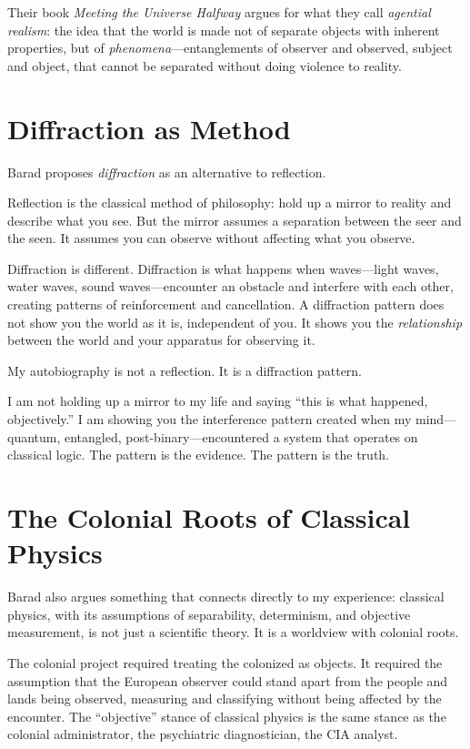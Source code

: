 \documentclass[11pt,openany]{book}
\begin{document}
Their book \textit{Meeting the Universe Halfway} argues for what they call \textit{agential realism}: the idea that the world is made not of separate objects with inherent properties, but of \textit{phenomena}---entanglements of observer and observed, subject and object, that cannot be separated without doing violence to reality.

\section*{Diffraction as Method}

Barad proposes \textit{diffraction} as an alternative to reflection.

Reflection is the classical method of philosophy: hold up a mirror to reality and describe what you see. But the mirror assumes a separation between the seer and the seen. It assumes you can observe without affecting what you observe.

Diffraction is different. Diffraction is what happens when waves---light waves, water waves, sound waves---encounter an obstacle and interfere with each other, creating patterns of reinforcement and cancellation. A diffraction pattern does not show you the world as it is, independent of you. It shows you the \textit{relationship} between the world and your apparatus for observing it.

My autobiography is not a reflection. It is a diffraction pattern.

I am not holding up a mirror to my life and saying ``this is what happened, objectively.'' I am showing you the interference pattern created when my mind---quantum, entangled, post-binary---encountered a system that operates on classical logic. The pattern is the evidence. The pattern is the truth.

\section*{The Colonial Roots of Classical Physics}

Barad also argues something that connects directly to my experience: classical physics, with its assumptions of separability, determinism, and objective measurement, is not just a scientific theory. It is a worldview with colonial roots.

The colonial project required treating the colonized as objects. It required the assumption that the European observer could stand apart from the people and lands being observed, measuring and classifying without being affected by the encounter. The ``objective'' stance of classical physics is the same stance as the colonial administrator, the psychiatric diagnostician, the CIA analyst.
\end{document}
